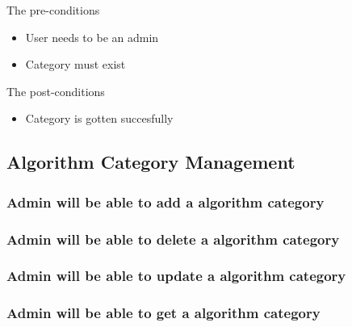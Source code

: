 The pre-conditions
\begin{itemize}
  \item User needs to be an admin
  \item Category must exist
\end{itemize}

The post-conditions
\begin{itemize}
  \item Category is gotten succesfully
\end{itemize}

\subsection{Algorithm Category Management}

\subsubsection {Admin will be able to add a algorithm category}
\subsubsection {Admin will be able to delete a algorithm category}
\subsubsection {Admin will be able to update a algorithm category}
\subsubsection {Admin will be able to get a algorithm category}







